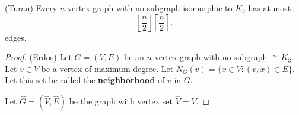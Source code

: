 \begin{theorem}
	(Turan) Every \( n \)-vertex graph with no subgraph isomorphic to \( K_3 \) has at most \[
		\left\lfloor \frac{n}{2} \right\rfloor \left\lceil \frac{n}{2} \right\rceil 
	.\] edges.
\end{theorem}
\begin{proof}
	(Erdos) Let \( G = (V,E) \) be an \( n \)-vertex graph with no subgraph \( \cong K_3 \). Let \( v \in V \) be a vertex of maximum degree. Let \( N_G(v) = \{x \in V : (v, x) \in E\}   \). Let this set be called the \textbf{neighborhood} of \( v \) in \( G \). 

	Let \( \hat{G} = (\hat{V}, \hat{E})\) be the graph with vertex set \( \hat{V}=V \).
\end{proof}
